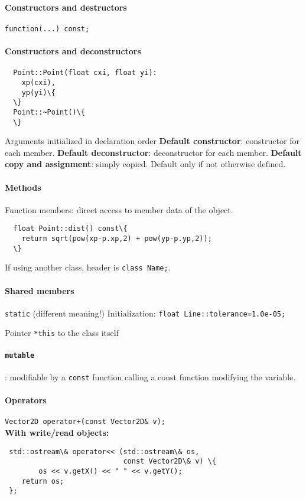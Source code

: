\documentclass{article}
\begin{document}
\paragraph{Constructors and destructors}
\texttt{function(...) const;}
\paragraph{Constructors and deconstructors}
\begin{lstlisting}
  Point::Point(float cxi, float yi):
    xp(cxi),
    yp(yi)\{
  \}
  Point::~Point()\{
  \}
\end{lstlisting}
Arguments initialized in declaration order
\textbf{Default constructor}: constructor for each member.
\textbf{Default deconstructor}: deconstructor for each member.
\textbf{Default copy and assignment}: simply copied.
Default only if not otherwise defined.
\paragraph{Methods}
Function members: direct access to member data of the object.
\begin{lstlisting}
  float Point::dist() const\{
    return sqrt(pow(xp-p.xp,2) + pow(yp-p.yp,2));
  \}
\end{lstlisting}
If using another class, header is \texttt{class Name;}.
\paragraph{Shared members}
\texttt{static} (different meaning!)
Initialization: \texttt{float Line::tolerance=1.0e-05;}

Pointer \texttt{*this} to the class itself
\paragraph{\texttt{mutable}}: modifiable by a \texttt{const} function calling a const function modifying the variable.

\paragraph{Operators}
\texttt{Vector2D operator+(const Vector2D\& v);} \\
\textbf{With write/read objects:}
\begin{lstlisting}
 std::ostream\& operator<< (std::ostream\& os, 
                            const Vector2D\& v) \{
		os << v.getX() << " " << v.getY();
    return os;
 };
\end{lstlisting}
\end{document}
